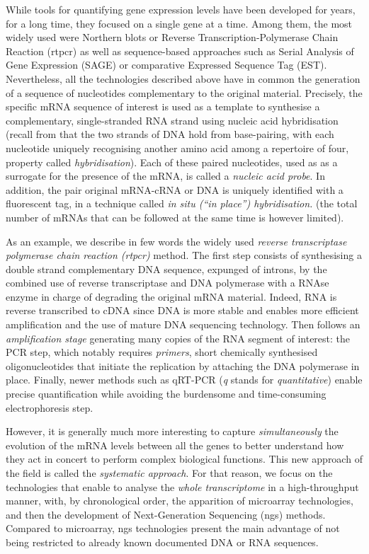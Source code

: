 While tools for quantifying gene expression levels have been developed for years, for a long time, they focused on a single gene at a time. Among them, the most widely used were Northern blots or Reverse Transcription-Polymerase Chain Reaction (\acrshort{rtpcr}) as well as sequence-based approaches such as Serial Analysis of Gene Expression (SAGE) or comparative Expressed Sequence Tag (EST). Nevertheless, all the technologies described above have in common the generation of a sequence of nucleotides complementary to the original material. Precisely, the specific mRNA sequence of interest is used as a template to synthesise a complementary, single-stranded RNA strand using nucleic acid hybridisation (recall from  that the two strands of DNA hold from base-pairing, with each nucleotide uniquely recognising another amino acid among a repertoire of four, property called \emph{hybridisation}). Each of these paired nucleotides, used as as a surrogate for the presence of the mRNA, is called a \emph{nucleic acid probe}. In addition, the pair original mRNA-cRNA or DNA is uniquely identified with a fluorescent tag, in a technique called \emph{in situ (\enquote{in place}) hybridisation.} (the total number of mRNAs that can be followed at the same time is however limited). 


As an example, we describe in few words the widely used \emph{reverse transcriptase polymerase chain reaction (\acrshort{rtpcr})} method. The first step consists of synthesising a double strand complementary DNA sequence, expunged of introns, by the combined use of reverse transcriptase and DNA polymerase with a RNAse enzyme in charge of degrading the original mRNA material. Indeed, RNA is reverse transcribed to cDNA since DNA is more stable and enables more efficient amplification and the use of mature DNA sequencing technology. Then follows an \emph{amplification stage} generating many copies of the RNA segment of interest: the PCR step, which notably requires \emph{primers}, short chemically synthesised oligonucleotides that initiate the replication by attaching the DNA polymerase in place. Finally, newer methods such as qRT-PCR (\emph{q} stands for \emph{quantitative}) enable precise quantification while avoiding the burdensome and time-consuming electrophoresis step.


However, it is generally much more interesting to capture \emph{simultaneously} the evolution of the mRNA levels between all the genes to better understand how they act in concert to perform complex biological functions. This new approach of the field is called the \emph{systematic approach}. For that reason, we focus on the technologies that enable to analyse the \emph{whole transcriptome} in a high-throughput manner, with, by chronological order, the apparition of microarray technologies, and then the development of Next-Generation Sequencing (\acrshort{ngs}) methods. Compared to microarray, \acrshort{ngs} technologies present the main advantage of not being restricted to already known documented DNA or RNA sequences. 

